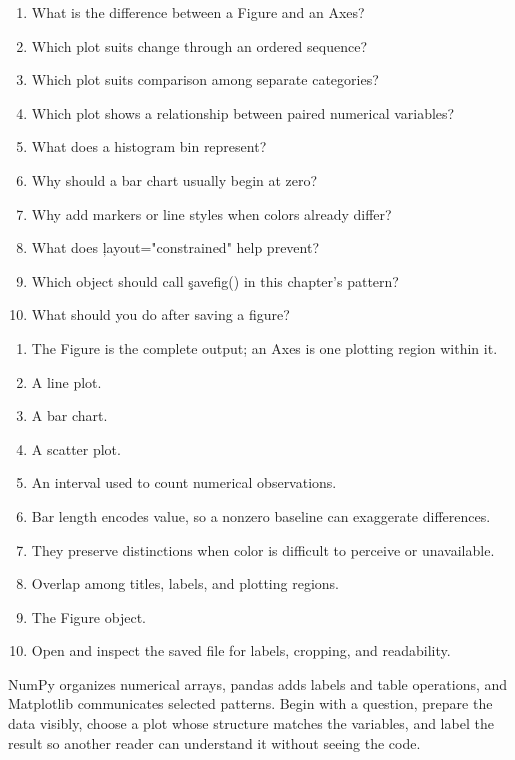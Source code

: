 \begin{enumerate}
    \item What is the difference between a Figure and an Axes?
    \item Which plot suits change through an ordered sequence?
    \item Which plot suits comparison among separate categories?
    \item Which plot shows a relationship between paired numerical variables?
    \item What does a histogram bin represent?
    \item Why should a bar chart usually begin at zero?
    \item Why add markers or line styles when colors already differ?
    \item What does \c{layout="constrained"} help prevent?
    \item Which object should call \c{savefig()} in this chapter's pattern?
    \item What should you do after saving a figure?
\end{enumerate}


\begin{enumerate}
    \item The Figure is the complete output; an Axes is one plotting region within it.
    \item A line plot.
    \item A bar chart.
    \item A scatter plot.
    \item An interval used to count numerical observations.
    \item Bar length encodes value, so a nonzero baseline can exaggerate differences.
    \item They preserve distinctions when color is difficult to perceive or unavailable.
    \item Overlap among titles, labels, and plotting regions.
    \item The Figure object.
    \item Open and inspect the saved file for labels, cropping, and readability.
\end{enumerate}

\begin{tcolorbox}[title=Part IV summary,colframe=orange,colback=white,arc=2mm]
NumPy organizes numerical arrays, pandas adds labels and table operations, and
Matplotlib communicates selected patterns. Begin with a question, prepare the
data visibly, choose a plot whose structure matches the variables, and label
the result so another reader can understand it without seeing the code.
\end{tcolorbox}

